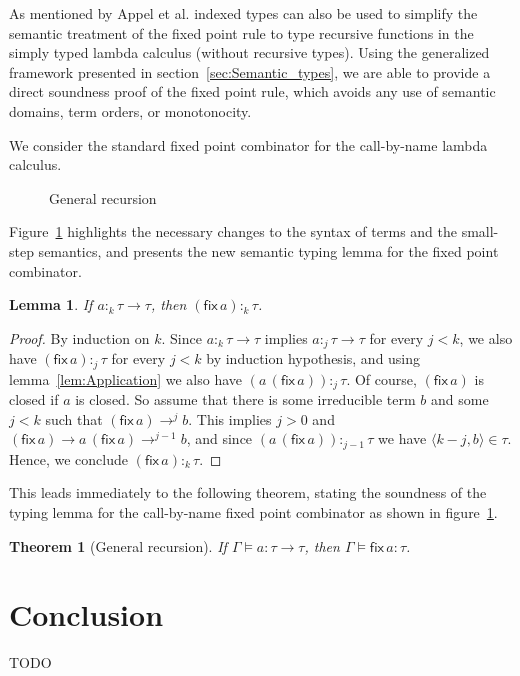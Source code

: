 \documentclass[12pt,a4paper,draft]{article}
\theoremstyle{definition}
\theoremstyle{plain}
\newtheorem{lemma}[definition]{Lemma}
\newtheorem{theorem}[definition]{Theorem}
\newcommand{\app}[2]{\ensuremath{{#1}\,{#2}}}
\newcommand{\fix}[1]{\ensuremath{\mathsf{fix}\,{#1}}}
\newcommand{\pair}[1]{\ensuremath{\langle{#1}\rangle}}
\begin{document}
As mentioned by Appel et al. \cite{Appel01} indexed types can also be used to simplify the semantic treatment of the
fixed point rule to type recursive functions in the simply typed lambda calculus (without recursive types). Using the
generalized framework presented in section~\ref{sec:Semantic_types}, we are able to provide a direct soundness proof
of the fixed point rule, which avoids any use of semantic domains, term orders, or monotonocity.

We consider the standard fixed point combinator for the call-by-name lambda calculus.
\begin{figure}[htb]
  \centering
  \caption{General recursion}
  \label{fig:General_recursion}
\end{figure}
Figure~\ref{fig:General_recursion} highlights the necessary changes to the syntax of terms
and the small-step semantics, and presents the new semantic typing lemma for the fixed point
combinator.

\begin{lemma}
  If $a :_k \tau \to \tau$, then $(\fix{a}) :_k \tau$.
\end{lemma}

\begin{proof}
  By induction on $k$. Since $a :_k \tau \to \tau$ implies $a :_j \tau \to \tau$ for every $j < k$,
  we also have $(\fix{a}) :_j \tau$ for every $j < k$ by induction hypothesis, and using lemma~\ref{lem:Application}
  we also have $(\app{a}{(\fix{a})}) :_j \tau$. Of course, $(\fix{a})$ is closed if $a$ is closed.
  So assume that there is some irreducible term $b$ and some $j < k$ such that $(\fix{a}) \to^j b$.
  This implies $j > 0$ and $(\fix{a}) \to \app{a}{(\fix{a})} \to^{j-1} b$, and since
  $(\app{a}{(\fix{a})}) :_{j-1} \tau$ we have $\pair{k-j,b} \in \tau$. Hence, we conclude
  $(\fix{a}) :_k \tau$.
\end{proof}

This leads immediately to the following theorem, stating the soundness of the typing lemma
for the call-by-name fixed point combinator as shown in figure~\ref{fig:General_recursion}.

\begin{theorem}[General recursion]
  If $\Gamma \models a : \tau \to \tau$, then $\Gamma \models \fix{a} : \tau$.
\end{theorem}


\section{Conclusion}
\label{sec:Conclusion}


TODO




\end{document}
